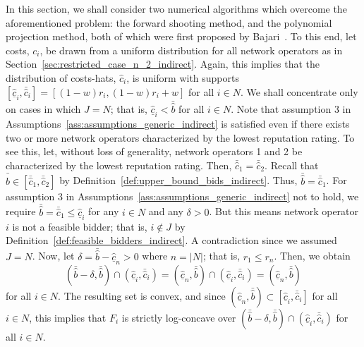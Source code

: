 In this section, we shall consider two numerical algorithms which overcome the aforementioned problem: the forward shooting method, and the polynomial projection method, both of which were first proposed by Bajari~\cite{Bajari2001a}. To this end, let costs, $c_i$, be drawn from a uniform distribution for all network operators as in Section~\ref{sec:restricted_case_n_2_indirect}. Again, this implies that the distribution of costs-hats, $\hat{c}_i$, is uniform with supports $[\underline{\hat{c}}_i, \bar{\hat{c}}_i] = [(1-w)r_i, (1-w)r_i + w]$ for all $i\in N$. We shall concentrate only on cases in which $J=N$; that is, $\underline{\hat{c}}_i < \bar{\hat{b}}$ for all $i\in N$. Note that assumption 3 in Assumptions~\ref{ass:assumptions_generic_indirect} is satisfied even if there exists two or more network operators characterized by the lowest reputation rating. To see this, let, without loss of generality, network operators 1 and 2 be characterized by the lowest reputation rating. Then, $\bar{\hat{c}}_1 = \bar{\hat{c}}_2$. Recall that $\bar{\hat{b}}\in [\bar{\hat{c}}_1, \bar{\hat{c}}_2]$ by Definition~\ref{def:upper_bound_bids_indirect}. Thus, $\bar{\hat{b}} = \bar{\hat{c}}_1$. For assumption 3 in Assumptions~\ref{ass:assumptions_generic_indirect} not to hold, we require $\bar{\hat{b}} = \bar{\hat{c}}_1 \leq \underline{\hat{c}}_i$ for any $i\in N$ and any $\delta>0$. But this means network operator $i$ is not a feasible bidder; that is, $i\not\in J$ by Definition~\ref{def:feasible_bidders_indirect}. A contradiction since we assumed $J = N$. Now, let $\delta = \bar{\hat{b}} - \underline{\hat{c}}_n > 0$ where $n = |N|$; that is, $r_1\leq r_n$. Then, we obtain
\begin{equation*}
(\bar{\hat{b}}-\delta, \bar{\hat{b}})\cap (\underline{\hat{c}}_i, \bar{\hat{c}}_i) = (\underline{\hat{c}}_n, \bar{\hat{b}})\cap (\underline{\hat{c}}_i, \bar{\hat{c}}_i) = (\underline{\hat{c}}_n, \bar{\hat{b}})
\end{equation*}
for all $i\in N$. The resulting set is convex, and since $(\underline{\hat{c}}_n, \bar{\hat{b}})\subset [\underline{\hat{c}}_i, \bar{\hat{c}}_i]$ for all $i\in N$, this implies that $F_i$ is strictly log-concave over $(\bar{\hat{b}}-\delta, \bar{\hat{b}})\cap (\underline{\hat{c}}_i, \bar{\hat{c}}_i)$ for all $i\in N$.

